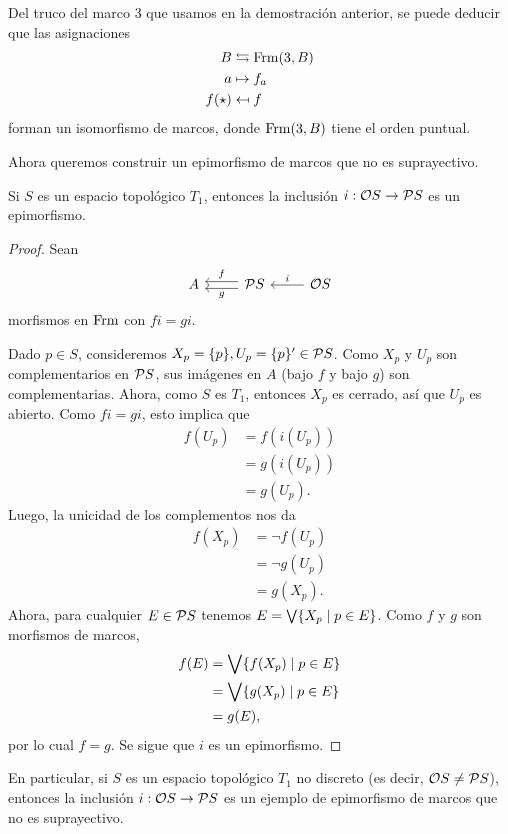 Del truco del marco $3$ que usamos en la demostración anterior,
se puede deducir que las asignaciones
\begin{align*}
    B &\leftrightarrows \Frm(3,B) \\
    a &\mapsto f_a \\
    f(\star) &\mapsfrom f
\end{align*}
forman un isomorfismo de marcos,
donde $\Frm(3,B)$ tiene el orden puntual.

Ahora queremos construir un epimorfismo de marcos que no es
suprayectivo.
\begin{lemma}
    Si $S$ es un espacio topológico $T_1$, entonces
    la inclusión $i:\cal OS\to\cal PS$ es un epimorfismo.
\end{lemma}
\begin{proof}
    Sean
    \[
        \begin{tikzcd}
            A
            & \cal PS \ar[l,"f"',shift right] \ar[l,"g",shift left]
            & \cal OS \ar[l,"i"']
        \end{tikzcd}
    \]
    morfismos en $\Frm$ con $fi=gi$.
    
    Dado $p\in S$, consideremos $X_p=\{p\},U_p=\{p\}'\in\cal PS$.
    Como $X_p$ y $U_p$ son complementarios en $\cal PS$,
    sus imágenes en $A$ (bajo $f$ y bajo $g$) son complementarias.
    Ahora, como $S$ es $T_1$, entonces $X_p$ es cerrado, así que
    $U_p$ es abierto.
    Como $fi=gi$, esto implica que
    \begin{align*}
        f(U_p)
        &= f(i(U_p)) \\
        &= g(i(U_p)) \\
        &= g(U_p).
    \end{align*}
    Luego, la unicidad de los complementos nos da
    \begin{align*}
        f(X_p)
        &= \neg f(U_p) \\
        &= \neg g(U_p) \\
        &= g(X_p).
    \end{align*}
    Ahora, para cualquier $E\in\cal PS$ tenemos
    $E=\Sup\{X_p\mid p\in E\}$.
    Como $f$ y $g$ son morfismos de marcos,
    \begin{align*}
        f(E)
        &= \Sup\{f(X_p) \mid p\in E\} \\
        &= \Sup\{g(X_p) \mid p\in E\} \\
        &= g(E),
    \end{align*}
    por lo cual $f=g$.
    Se sigue que $i$ es un epimorfismo.
\end{proof}
En particular, si $S$ es un espacio topológico $T_1$ no discreto
(es decir, $\cal OS\neq\cal PS$), entonces la inclusión
$i:\cal OS\to\cal PS$ es un ejemplo de epimorfismo de marcos que
no es suprayectivo.

